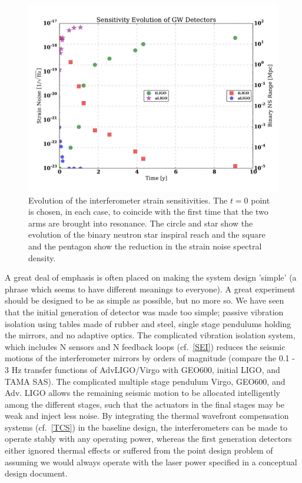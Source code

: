 \begin{figure}[h]
\centering
\includegraphics[width=\columnwidth]{Figures/NoiseProgComp.pdf}
\caption{Evolution of the interferometer strain sensitivities. The $t = 0$
  point is chosen, in each case, to coincide with the first time that the
  two arms are brought into resonance. The circle and star show the evolution of
  the binary neutron star inspiral reach and the square and the pentagon show
  the reduction in the strain noise spectral density.}
\label{fig:IDC:SensEvo}
\end{figure}

A great deal of emphasis is often placed on making the system design 'simple'
(a phrase which seems to have different meanings to everyone). A great
experiment should be designed to be as simple as possible, but no more so. We have
seen that the initial generation of detector was made too simple; passive vibration
isolation using tables made of rubber and steel, single stage pendulums holding
the mirrors, and no adaptive optics. The complicated vibration isolation system,
which includes N sensors and N feedback loops (cf.~\ref{SEI}) reduces the seismic
motions of the interferometer mirrors by orders of magnitude (compare the 0.1 - 3 Hz
transfer functions of AdvLIGO/Virgo with GEO600, initial LIGO, and TAMA SAS). The
complicated multiple stage pendulum Virgo, GEO600, and Adv. LIGO allows the remaining
seismic motion to be allocated intelligently among the different stages, such that
the actuators in the final stages may be weak and inject less noise. By integrating
the thermal wavefront compensation systems (cf.~\ref{TCS}) in the baseline design,
the interferometers can be made to operate stably with any operating power, whereas
the first generation detectors either ignored thermal effects or suffered from
the point design problem of assuming we would always operate with the laser power
specified in a conceptual design document.

